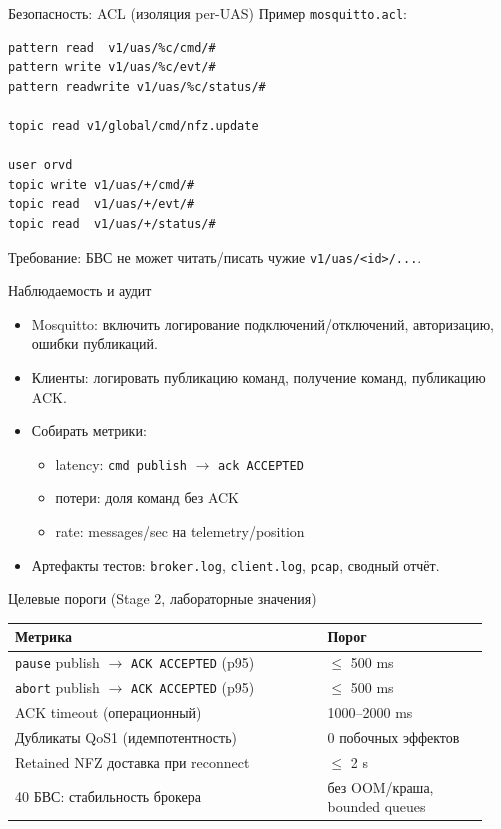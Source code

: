 \documentclass[aspectratio=169]{beamer}
\begin{document}
\begin{frame}{Безопасность: ACL (изоляция per-UAS)}
\small
Пример \texttt{mosquitto.acl}:
\begin{verbatim}
pattern read  v1/uas/%c/cmd/#
pattern write v1/uas/%c/evt/#
pattern readwrite v1/uas/%c/status/#

topic read v1/global/cmd/nfz.update

user orvd
topic write v1/uas/+/cmd/#
topic read  v1/uas/+/evt/#
topic read  v1/uas/+/status/#
\end{verbatim}
Требование: БВС не может читать/писать чужие \texttt{v1/uas/<id>/...}.
\end{frame}

\begin{frame}{Наблюдаемость и аудит}
\begin{itemize}
  \item Mosquitto: включить логирование подключений/отключений, авторизацию, ошибки публикаций.
  \item Клиенты: логировать публикацию команд, получение команд, публикацию ACK.
  \item Собирать метрики:
  \begin{itemize}
    \item latency: \texttt{cmd publish} $\rightarrow$ \texttt{ack ACCEPTED}
    \item потери: доля команд без ACK
    \item rate: messages/sec на telemetry/position
  \end{itemize}
  \item Артефакты тестов: \texttt{broker.log}, \texttt{client.log}, \texttt{pcap}, сводный отчёт.
\end{itemize}
\end{frame}

\begin{frame}{Целевые пороги (Stage 2, лабораторные значения)}
\small
\begin{tabular}{@{}p{0.62\linewidth}p{0.32\linewidth}@{}}
\toprule
Метрика & Порог \\
\midrule
\texttt{pause} publish $\rightarrow$ \texttt{ACK ACCEPTED} (p95) & $\le$ 500 ms \\
\texttt{abort} publish $\rightarrow$ \texttt{ACK ACCEPTED} (p95) & $\le$ 500 ms \\
ACK timeout (операционный) & 1000--2000 ms \\
Дубликаты QoS1 (идемпотентность) & 0 побочных эффектов \\
Retained NFZ доставка при reconnect & $\le$ 2 s \\
40 БВС: стабильность брокера & без OOM/краша, bounded queues \\
\bottomrule
\end{tabular}
\end{frame}
\end{document}
